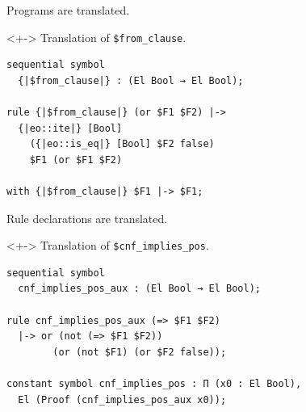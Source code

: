 \documentclass[handout, lualatex, compress, 12pt-------------------------------------------------------------------------------------------------------------]{beamer}
\begin{document}
\begin{frame}[fragile]
	Programs are translated.\\[2mm]
	\begin{uncoverenv}<+->%
		\exxample Translation of \texttt{\$from\_clause}.
		\begin{lstlisting}
sequential symbol
  {|$from_clause|} : (El Bool → El Bool);

rule {|$from_clause|} (or $F1 $F2) |->
  {|eo::ite|} [Bool]
    ({|eo::is_eq|} [Bool] $F2 false)
    $F1 (or $F1 $F2)

with {|$from_clause|} $F1 |-> $F1;\end{lstlisting}
	\end{uncoverenv}
\end{frame}

\begin{frame}[fragile]
	Rule declarations are translated.\\[2mm]
	\begin{uncoverenv}<+->%
		\exxample Translation of \texttt{\$cnf\_implies\_pos}.
		\begin{lstlisting}
sequential symbol
  cnf_implies_pos_aux : (El Bool → El Bool);

rule cnf_implies_pos_aux (=> $F1 $F2)
  |-> or (not (=> $F1 $F2))
        (or (not $F1) (or $F2 false));

constant symbol cnf_implies_pos : Π (x0 : El Bool),
  El (Proof (cnf_implies_pos_aux x0));\end{lstlisting}
	\end{uncoverenv}
\end{frame}
\end{document}
